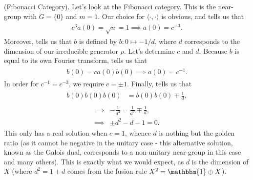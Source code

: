\noindent 
\newpage

\noindent\begin{example}\textup{(Fibonacci Category).} Let's look at the Fibonacci category. This is the near-group with $G = \{0\}$ and $m = 1$. Our choice for $\langle\cdot,\cdot\rangle$ is obvious, and \cite[Lemma 7.1]{Izu17} tells us that
\begin{align*}
\begin{split}
c^3 a(0) = \sqrt{n} = 1 \implies a(0) = c^{-3}.
\end{split}
\end{align*}
\noindent Moreover, \cite[Theorem 9.1]{Izu17} tells us that $b$ is defined by $b : 0 \mapsto -1/d$, where $d$ corresponds to the dimension of our irreducible generator $\rho$. Let's determine $c$ and $d$. Because $b$ is equal to its own Fourier transform, \cite[Theorem 9.1]{Izu17} tells us that
\begin{align*}
\begin{split}
b(0) = ca(0)b(0) \implies a(0) = c^{-1}.
\end{split}
\end{align*}
\noindent In order for $c^{-1} = c^{-3}$, we require $c = \pm 1$. Finally, \cite[Equation (9.5)]{Izu17} tells us that
\begin{align*}
\begin{split}
b(0)b(0)b(0) &= b(0)b(0) \mp \frac{1}{d},
\end{split}
\end{align*}
\begin{align*}
\begin{split}
\implies &-\frac{1}{d^3} = \frac{1}{d^2} \mp \frac{1}{d},\\
\implies &\pm d^2 - d - 1 = 0.
\end{split}
\end{align*}
\noindent This only has a real solution when $c = 1$, whence $d$ is nothing but the golden ratio (as it cannot be negative in the unitary case - this alternative solution, known as the Galois dual, corresponds to a non-unitary near-group in this case and many others). This is exactly what we would expect, as $d$ is the dimension of $X$ (where $d^2 = 1 + d$ comes from the fusion rule $X^2 = \mathbbm{1} \oplus X$).\\
\end{example}

